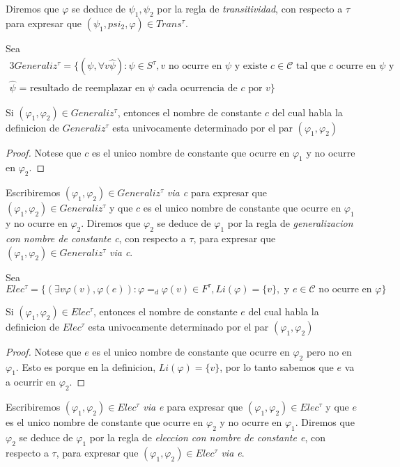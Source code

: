 \begin{definition}
  Diremos que $\varphi$ se deduce de $\psi_1,\psi_2$ por la regla de \emph{transitividad}, con respecto a $\tau$ para expresar que 
  $(\psi_1,psi_2,\varphi) \in Trans^\tau$.

  Sea 
  \begin{alignat*}{3}
    Generaliz^\tau=\{(\psi,\forall v\hat\psi): \psi\in S^\tau, v \text{ no ocurre en $\psi$ y existe $c \in \mathcal{C}$ tal que $c$ ocurre en $\psi$ y} \\
    \text{$\hat\psi$ = resultado de reemplazar en $\psi$ cada ocurrencia de $c$ por $v$}\}
  \end{alignat*}

  \begin{lemma}
    Si $(\varphi_1,\varphi_2) \in Generaliz^\tau$, entonces el nombre de constante $c$ del cual habla la definicion de $Generaliz^\tau$ esta univocamente determinado
    por el par $(\varphi_1,\varphi_2)$
  \end{lemma}
  \begin{proof}
    Notese que $c$ es el unico nombre de constante que ocurre en $\varphi_1$ y no ocurre en $\varphi_2$.
  \end{proof}

  Escribiremos $(\varphi_1,\varphi_2)\in Generaliz^\tau$ \emph{via c} para expresar que $(\varphi_1,\varphi_2) \in Generaliz^\tau$ y que $c$
  es el unico nombre de constante que ocurre en $\varphi_1$ y no ocurre en $\varphi_2$. Diremos que $\varphi_2$ se deduce de $\varphi_1$ por la regla de  \emph{generalizacion con nombre de constante c},
  con respecto a $\tau$, para expresar que $(\varphi_1,\varphi_2)\in Generaliz^\tau$ \emph{via c}.

  Sea 
  $$
  Elec^\tau = \{(\exists v\varphi(v), \varphi(e)):\varphi =_d \varphi(v)\in F^\tau, Li(\varphi) =\{v\}, \text{ y } e\in \mathcal{C} \text{ no ocurre en }\varphi\}
  $$

  \begin{lemma}
    Si $(\varphi_1,\varphi_2) \in Elec^\tau$, entonces el nombre de constante $e$ del cual habla la definicion de $Elec^\tau$
    esta univocamente determinado por el par $(\varphi_1,\varphi_2)$
  \end{lemma}
  \begin{proof}
    Notese que $e$ es el unico nombre de constante que ocurre en $\varphi_2$ pero no en $\varphi_1$. Esto es porque en la definicion, $Li(\varphi) = \{v\}$,
    por lo tanto sabemos que $e$ va a ocurrir en $\varphi_2$.
  \end{proof}

  Escribiremos $(\varphi_1,\varphi_2)\in Elec^\tau$ \emph{via e} para expresar que $(\varphi_1,\varphi_2) \in Elec^\tau$ y que $e$
  es el unico nombre de constante que ocurre en $\varphi_2$ y no ocurre en $\varphi_1$. Diremos que $\varphi_2$ se deduce de $\varphi_1$ por la regla de  \emph{eleccion con nombre de constante e},
  con respecto a $\tau$, para expresar que $(\varphi_1,\varphi_2)\in Elec^\tau$ \emph{via e}.
\end{definition}

